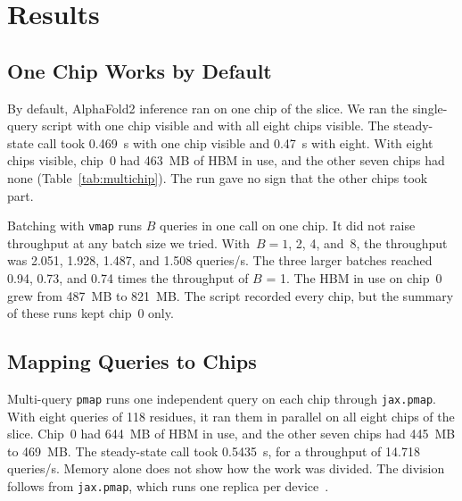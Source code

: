\section{Results}\label{sec:results}

\subsection{One Chip Works by Default}\label{sec:res-default}
\begin{table}[t]
\caption{\capTabMultichip}\label{tab:multichip}
\centering\small{}
\end{table}

By default, AlphaFold2 inference ran on one chip of the slice. We ran the single-query script with one chip visible and
with all eight chips visible. The steady-state call took 0.469~s with one chip visible and 0.47~s with eight. %
With eight chips visible, chip~0 had 463~MB of HBM in use, and the other seven chips had none (Table~\ref{tab:multichip}). %
The run gave no sign that the other chips took part.

Batching with \texttt{vmap} runs $B$ queries in one call on one chip. It did not raise throughput at any batch size we
tried. With~$B = 1$, 2, 4, and~8, the throughput was 2.051, 1.928, 1.487, and 1.508 queries/s. %
The three larger batches reached 0.94, 0.73, and 0.74 times the throughput of $B$ = 1. %
The HBM in use on chip~0 grew from 487~MB to 821~MB. The script recorded every chip, but the summary of these runs kept chip~0 only. %

\subsection{Mapping Queries to Chips}\label{sec:res-pmap}
Multi-query \texttt{pmap} runs one independent query on each chip through \texttt{jax.pmap}. With eight queries of 118
residues, it ran them in parallel on all eight chips of the slice. %
Chip~0 had 644~MB of HBM in use, and the other seven chips had 445~MB to 469~MB. %
The steady-state call took 0.5435~s, for a throughput of 14.718 queries/s. %
Memory alone does not show how the work was divided. The division follows from \texttt{jax.pmap}, which runs one replica per device~\cite{jaxpmap}.


